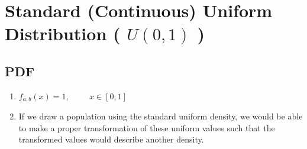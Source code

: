 \section{Standard (Continuous) Uniform Distribution ( $U(0, 1)$ )}

\subsection{PDF}

\begin{enumerate}
    \item[] $f_{a,b}(x) = 1, \hspace{1cm} x \in [0, 1]$
    \hfill \cite{statistics/book/Statistics-for-Data-Scientists/Maurits-Kaptein}

    \item If we draw a population using the standard uniform density, we would be able to make a proper transformation of these uniform values such that the transformed values would describe another density. 
    \hfill \cite{statistics/book/Statistics-for-Data-Scientists/Maurits-Kaptein}
\end{enumerate}








